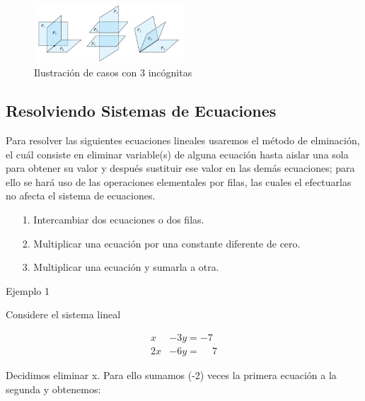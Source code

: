 \documentclass{article}
\begin{document}
\begin{figure}[ht]
    \centerline{\includegraphics[width=0.5\textwidth]{image4.png}}
    \caption{Ilustración de casos con 3 incógnitas}
    \label{}
  \end{figure}

\subsection{Resolviendo Sistemas de Ecuaciones}

Para resolver las siguientes ecuaciones lineales usaremos el método de elminación, el cuál consiste en eliminar variable(s) de alguna ecuación hasta aislar una sola para obtener su valor y después sustituir ese valor en las demás ecuaciones; para ello se hará uso de las operaciones elementales por filas, las cuales el efectuarlas no afecta el sistema de ecuaciones. 

\begin{tcolorbox}[colback=blue!10!white,colframe=blue!60!black,title=Operaciones Elementales por filas]
    \begin{itemize}
        \item[1.] Intercambiar dos ecuaciones o dos filas.
        \item[2.] Multiplicar una ecuación por una constante diferente de cero.
        \item[3.] Multiplicar una ecuación y sumarla a otra.
    \end{itemize}
\end{tcolorbox}

\begin{large}
    Ejemplo 1
\end{large}
Considere el sistema lineal

\begin{equation*}
    \begin{aligned}
            x &- 3y = -7\\
            2x &-6y = \phantom{-} 7
    \end{aligned}
\end{equation*}

Decidimos eliminar x. Para ello sumamos (-2) veces la primera ecuación a la segunda y obtenemos:
\end{document}
